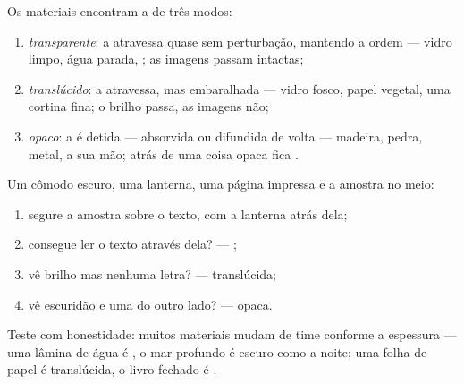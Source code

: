 \begin{definition}\label{def:g7:light-sources-propagation:coats}
Os materiais encontram a  de três modos:
\begin{enumerate}
  \item \emph{transparente}: a  atravessa
        quase sem perturbação, mantendo a ordem --- vidro limpo, água
        parada, ; as imagens passam intactas;
  \item \emph{translúcido}: a  atravessa, mas
        embaralhada --- vidro fosco, papel vegetal, uma cortina fina;
        o brilho passa, as imagens não;
  \item \emph{opaco}: a  é detida --- absorvida ou
        difundida de volta --- madeira, pedra, metal, a sua mão;
        atrás de uma coisa opaca fica .
\end{enumerate}
\end{definition}

\begin{method}\label{met:g7:light-sources-propagation:sort}
Um cômodo escuro, uma lanterna, uma página impressa e a amostra no
meio:
\begin{enumerate}
  \item segure a amostra sobre o texto, com a lanterna atrás dela;
  \item consegue ler o texto através dela? --- ;
  \item vê brilho mas nenhuma letra? --- translúcida;
  \item vê escuridão e uma  do outro lado? --- opaca.
\end{enumerate}
Teste com honestidade: muitos materiais mudam de time conforme a
espessura --- uma lâmina de água é , o mar profundo é
escuro como a noite; uma folha de papel é translúcida, o livro fechado
é .
\end{method}

